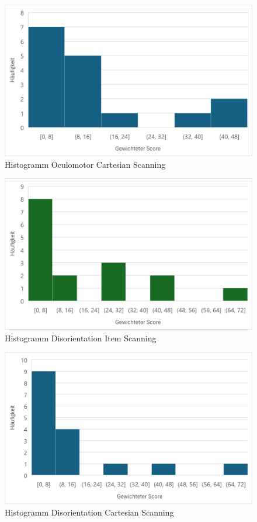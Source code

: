 \begin{figure}[tbh]
 \centering
\includegraphics{images/Results/Histogramm-Oculomotor-Scale-Cartesian.png}
 \caption{Histogramm Oculomotor Cartesian Scanning}
 \label{fig:histoOculomotorCartesian}
\end{figure}

\begin{figure}[tbh]
 \centering
\includegraphics{images/Results/Histogramm-Disorientation-Scale-Item.png}
 \caption{Histogramm Disorientation Item Scanning}
 \label{fig:histoDisorientationItem}
\end{figure}

\begin{figure}[tbh]
 \centering
\includegraphics{images/Results/Histogramm-Disorientation-Scale-Cartesian.png}
 \caption{Histogramm Disorientation Cartesian Scanning}
 \label{fig:histoDisorientationCartesian}
\end{figure}

